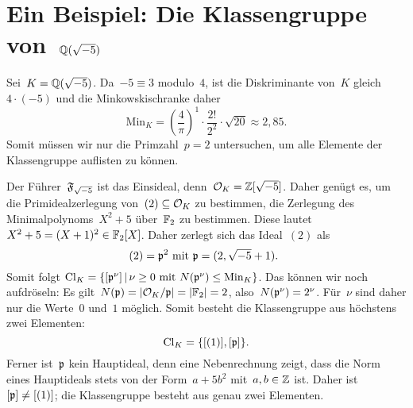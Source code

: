 \documentclass{uebblatt}
\newcommand{\Cl}{\mathrm{Cl}}
\newcommand{\Min}{\mathrm{Min}}
\begin{document}
\newpage
\section*{Ein Beispiel: Die Klassengruppe von~$\mathbb{Q}(\sqrt{-5})$}

Sei~$K = \mathbb{Q}(\sqrt{-5})$. Da~$-5 \equiv 3$ modulo~$4$, ist die Diskriminante
von~$K$ gleich~$4 \cdot (-5)$ und die Minkowskischranke daher
\[ \Min_K = \left(\frac{4}{\pi}\right)^1 \cdot \frac{2!}{2^2} \cdot \sqrt{20}
  \approx 2{,}85. \]
Somit müssen wir nur die Primzahl~$p = 2$ untersuchen, um alle Elemente der
Klassengruppe auflisten zu können.

Der Führer~$\mathfrak{F}_{\sqrt{-5}}$ ist das Einsideal, denn~$\mathcal{O}_K = \mathbb{Z}[\sqrt{-5}]$.
Daher genügt es, um die Primidealzerlegung von~$(2) \subseteq \mathcal{O}_K$ zu
bestimmen, die Zerlegung des Minimalpolynoms~$X^2 + 5$ über~$\mathbb{F}_2$ zu
bestimmen. Diese lautet
$X^2 + 5 = (X + 1)^2 \in \mathbb{F}_2[X]$.
Daher zerlegt sich das Ideal~$(2)$ als
\[ \text{$(2) = \mathfrak{p}^2$ mit~$\mathfrak{p} = (2, \sqrt{-5} + 1)$. } \]
Somit folgt
$\Cl_K = \{ [\ppp^\nu] \,|\, \text{$\nu \geq 0$ mit~$N(\ppp^\nu) \leq
\Min_K$} \}$.
Das können wir noch aufdröseln: Es gilt~$N(\mathfrak{p}) = |\mathcal{O}_K/\mathfrak{p}| = |\mathbb{F}_2| = 2$,
also~$N(\mathfrak{p}^\nu) = 2^\nu$. Für~$\nu$ sind daher nur die Werte~$0$ und~$1$
möglich. Somit besteht die Klassengruppe aus höchstens zwei
Elementen:
\[ \Cl_K = \{ [(1)], [\ppp] \}. \]
Ferner ist~$\mathfrak{p}$ kein Hauptideal, denn eine Nebenrechnung zeigt, dass die Norm
eines Hauptideals stets von der Form~$a + 5b^2$ mit~$a,b \in \mathbb{Z}$ ist. Daher
ist~$[\mathfrak{p}] \neq [(1)]$; die Klassengruppe besteht aus genau zwei Elementen.
\end{document}
